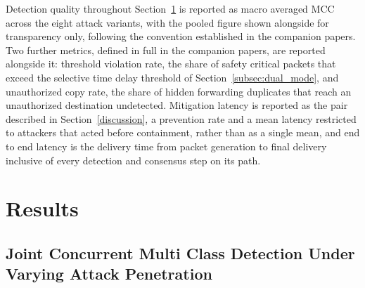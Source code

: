 \documentclass[lettersize,journal]{IEEEtran}
\theoremstyle{plain}
\theoremstyle{remark}
\newcommand{\TBD}{\textbf{TBD}} %
\begin{document}
	Detection quality throughout Section~\ref{results} is reported as macro
	averaged MCC across the eight attack variants, with the pooled figure
	shown alongside for transparency only, following the convention
	established in the companion papers. Two further metrics, defined in
	full in the companion papers, are reported alongside it: threshold
	violation rate, the share of safety critical packets that exceed the
	selective time delay threshold of Section~\ref{subsec:dual_mode}, and
	unauthorized copy rate, the share of hidden forwarding duplicates that
	reach an unauthorized destination undetected. Mitigation latency is
	reported as the pair described in Section~\ref{discussion}, a
	prevention rate and a mean latency restricted to attackers that acted
	before containment, rather than as a single mean, and end to end
	latency is the delivery time from packet generation to final delivery
	inclusive of every detection and consensus step on its path.
	
	
	\section{Results}\label{results}
	
	
	\subsection{Joint Concurrent Multi Class Detection Under Varying Attack Penetration}\label{subsec:n1}
	
\end{document}
